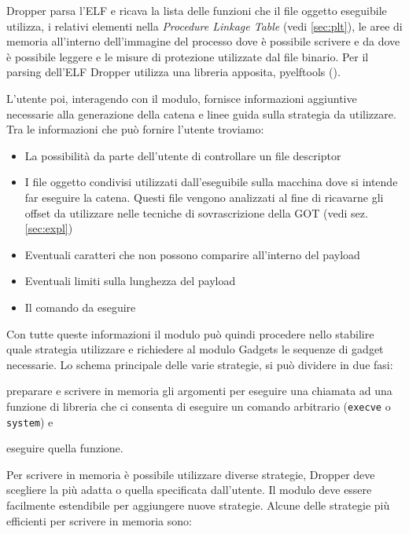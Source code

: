 Dropper parsa l'ELF e ricava la lista delle funzioni che il file
oggetto eseguibile utilizza, i relativi elementi nella \emph{Procedure
  Linkage Table} (vedi \ref{sec:plt}), le aree di memoria all'interno
dell'immagine del processo dove è possibile scrivere e da dove è
possibile leggere e le misure di protezione utilizzate dal file
binario. Per il parsing dell'ELF Dropper utilizza una libreria
apposita, pyelftools (\cite{pyelftools}).

L'utente poi, interagendo con il modulo, fornisce informazioni
aggiuntive necessarie alla generazione della catena e linee guida
sulla strategia da utilizzare. Tra le informazioni che può fornire
l'utente troviamo:

\begin{itemize}
  \item La possibilità da parte dell'utente di controllare un file
    descriptor
  \item I file oggetto condivisi utilizzati dall'eseguibile sulla
    macchina dove si intende far eseguire la catena. Questi file
    vengono analizzati al fine di ricavarne gli offset da utilizzare
    nelle tecniche di sovrascrizione della GOT (vedi
    sez. \ref{sec:expl})
  \item Eventuali caratteri che non possono comparire all'interno del
    payload
  \item Eventuali limiti sulla lunghezza del payload
  \item Il comando da eseguire
\end{itemize}

Con tutte queste informazioni il modulo può quindi procedere nello
stabilire quale strategia utilizzare e richiedere al modulo
Gadgets le sequenze di gadget necessarie. Lo schema principale
delle varie strategie, si può dividere in due fasi: 

\begin{inparaenum}[1)]
\item preparare e scrivere in memoria gli argomenti per eseguire una
  chiamata ad una funzione di libreria che ci consenta di eseguire un
  comando arbitrario (\lstinline{execve} o \lstinline{system}) e
\item eseguire quella
funzione.
\end{inparaenum}

Per scrivere in memoria è possibile utilizzare diverse strategie,
Dropper deve scegliere la più adatta o quella specificata
dall'utente. Il modulo deve essere facilmente estendibile per
aggiungere nuove strategie. Alcune delle strategie più efficienti per
scrivere in memoria sono:

